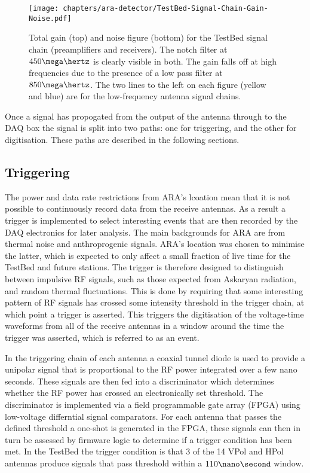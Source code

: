\begin{figure}[htpb]
  \centering
  \texttt{[image: chapters/ara-detector/TestBed-Signal-Chain-Gain-Noise.pdf]}
  \caption{Total gain (top) and noise figure (bottom) for the TestBed signal chain (preamplifiers and receivers). The notch filter at $450 \mega\hertz$ is clearly visible in both. The gain falls off at high frequencies due to the presence of a low pass filter at $850 \mega \hertz$. The two lines to the left on each figure (yellow and blue) are for the low-frequency antenna signal chains.}
  \label{fig:ara-detector:TestBed:Signal-Chain:Gain-Noise}
\end{figure}



Once a signal has propogated from the output of the antenna through to the DAQ box the signal is split into two paths: one for triggering, and the other for digitisation. These paths are described in the following sections.



\subsection{Triggering}
\label{sec:ara-detector:TestBed:Triggering}

The power and data rate restrictions from ARA's lcoation mean that it is not possible to continuously record data from the receive antennas. As a result a trigger is implemented to select interesting events that are then recorded by the DAQ electronics for later analysis. The main backgrounds for ARA are from thermal noise and anthroprogenic signals. ARA's location was chosen to minimise the latter, which is expected to only affect a small fraction of live time for the TestBed and future stations. The trigger is therefore designed to distinguish between impulsive RF signals, such as those expected from Askaryan radiation, and random thermal fluctuations. This is done by requiring that some interesting pattern of RF signals has crossed some intensity threshold in the trigger chain, at which point a trigger is asserted. This triggers the digitisation of the voltage-time waveforms from all of the receive antennas in a window around the time the trigger was asserted, which is referred to as an event.

In the triggering chain of each antenna a coaxial tunnel diode is used to provide a unipolar signal that is proportional to the RF power integrated over a few nano seconds. These signals are then fed into a discriminator which determines whether the RF power has crossed an electronically set threshold. The discriminator is implemented via a field programmable gate array (FPGA) using low-voltage differntial signal comparators. For each antenna that passes the defined threshold a one-shot is generated in the FPGA, these signals can then in turn be assessed by firmware logic to determine if a trigger condition has been met. In the TestBed the trigger condition is that 3 of the 14 VPol and HPol antennas produce signals that pass threshold within a $110 \nano\second$ window. 

